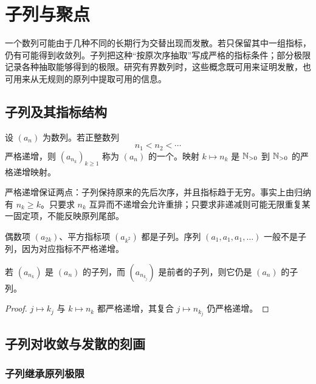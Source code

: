 \chapter{子列与聚点}
\label{chap:subsequences-cluster-points}
\label{chap:subsequences-bw}

一个数列可能由于几种不同的长期行为交替出现而发散。若只保留其中一组指标，仍有可能得到收敛列。子列把这种“按原次序抽取”写成严格的指标条件；部分极限记录各种抽取能够得到的极限。研究有界数列时，这些概念既可用来证明发散，也可用来从无规则的原列中提取可用的信息。

\section{子列及其指标结构}


\begin{definition}
设 \((a_n)\) 为数列。若正整数列
\[
 n_1<n_2<\cdots
\]
严格递增，则 \((a_{n_k})_{k\ge1}\) 称为 \((a_n)\) 的一个。映射 \(k\mapsto n_k\) 是 \(\mathbb{N}_{>0}\) 到 \(\mathbb{N}_{>0}\) 的严格递增映射。
\end{definition}

严格递增保证两点：子列保持原来的先后次序，并且指标趋于无穷。事实上由归纳有 \(n_k\ge k\)。只要求 \(n_k\) 互异而不递增会允许重排；只要求非递减则可能无限重复某一固定项，不能反映原列尾部。

\begin{example}
偶数项 \((a_{2k})\)、平方指标项 \((a_{k^2})\) 都是子列。序列
\((a_1,a_1,a_1,\ldots)\) 一般不是子列，因为对应指标不严格递增。
\end{example}

\begin{proposition}[子列的子列]
若 \((a_{n_k})\) 是 \((a_n)\) 的子列，而 \((a_{n_{k_j}})\) 是前者的子列，则它仍是 \((a_n)\) 的子列。
\end{proposition}

\begin{proof}
\(j\mapsto k_j\) 与 \(k\mapsto n_k\) 都严格递增，其复合 \(j\mapsto n_{k_j}\) 仍严格递增。
\end{proof}

\section{子列对收敛与发散的刻画}

\subsection{子列继承原列极限}


